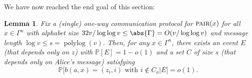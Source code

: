 \documentclass[a4paper,UKenglish,cleveref, autoref, thm-restate]{lipics-v2021}
\newtheorem{lemma}[theorem]{Lemma}
\theoremstyle{definition}
\renewcommand{\P}{\mathbb P}
\newcommand{\polylog}{\operatorname{polylog}}
\newcommand{\pair}{\normalfont\textsc{pair}\xspace}
\newcommand{\vcommitlength}{v}
\newcommand{\vcommitstring}{z}
\newcommand{\alphabet}{\Gamma}
\begin{document}
We have now reached the end goal of this section:
\begin{lemma}
    \label{lem:pair-x-bound}
     Fix a (single) one-way communication protocol for $\pair(x)$ for all $x \in \alphabet^n$ with alphabet size $32 \vcommitlength / \log\log \vcommitlength \leq \abs{\alphabet} = O(\vcommitlength / \log\log \vcommitlength)$ and message length $\log \vcommitlength \leq s = \polylog(\vcommitlength)$. Then, for any $x \in \alphabet^n$, there exists an event $E$ (that depends only on $\vcommitstring$) with $\P[E] = 1 - o(1)$ and a set $C$ of size $s$ (that depends only on Alice's message) satisfying
    \begin{equation*}
        \P\big[b(a,x) = (\vcommitstring_i,i) \text{ with } i \notin C_a \big| E \big] = o(1).
    \end{equation*}
\end{lemma}
\end{document}
